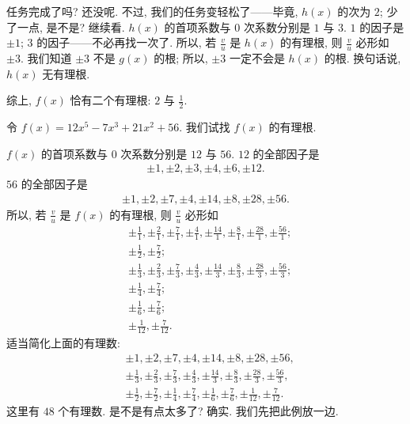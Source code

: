 \begin{example}
    任务完成了吗? 还没呢. 不过, 我们的任务变轻松了——毕竟, $h(x)$ 的次为 $2$; 少了一点, 是不是? 继续看. $h(x)$ 的首项系数与 $0$ 次系数分别是 $1$ 与 $3$. $1$ 的因子是 $\pm 1$; $3$ 的因子——不必再找一次了. 所以, 若 $\frac{v}{u}$ 是 $h(x)$ 的有理根, 则 $\frac{v}{u}$ 必形如 $\pm 3$. 我们知道 $\pm 3$ 不是 $g(x)$ 的根; 所以, $\pm 3$ 一定不会是 $h(x)$ 的根. 换句话说, $h(x)$ 无有理根.

    综上, $f(x)$ 恰有二个有理根: $2$ 与 $\frac{1}{2}$.
\end{example}

\begin{example}
    令 $f(x) = 12 x^5-7 x^3+21 x^2+56$. 我们试找 $f(x)$ 的有理根.

    $f(x)$ 的首项系数与 $0$ 次系数分别是 $12$ 与 $56$. $12$ 的全部因子是
    \begin{align*}
        \pm 1, \pm 2, \pm 3, \pm 4, \pm 6, \pm 12.
    \end{align*}
    $56$ 的全部因子是
    \begin{align*}
        \pm 1, \pm 2, \pm 7, \pm 4, \pm 14, \pm 8, \pm 28, \pm 56.
    \end{align*}
    所以, 若 $\frac{v}{u}$ 是 $f(x)$ 的有理根, 则 $\frac{v}{u}$ 必形如
    \begin{align*}
         & {\pm \frac{1}{1}}, {\pm \frac{2}{1}}, {\pm \frac{7}{1}}, {\pm \frac{4}{1}}, {\pm \frac{14}{1}}, {\pm \frac{8}{1}}, {\pm \frac{28}{1}}, {\pm \frac{56}{1}}; \\
         & {\pm \frac{1}{2}}, {\pm \frac{7}{2}};                                                                                                                      \\
         & {\pm \frac{1}{3}}, {\pm \frac{2}{3}}, {\pm \frac{7}{3}}, {\pm \frac{4}{3}}, {\pm \frac{14}{3}}, {\pm \frac{8}{3}}, {\pm \frac{28}{3}}, {\pm \frac{56}{3}}; \\
         & {\pm \frac{1}{4}}, {\pm \frac{7}{4}};                                                                                                                      \\
         & {\pm \frac{1}{6}}, {\pm \frac{7}{6}};                                                                                                                      \\
         & {\pm \frac{1}{12}}, {\pm \frac{7}{12}}.
    \end{align*}
    适当简化上面的有理数:
    \begin{align*}
         & {\pm 1}, {\pm 2}, {\pm 7}, {\pm 4}, {\pm 14}, {\pm 8}, {\pm 28}, {\pm 56},                                                                                 \\
         & {\pm \frac{1}{3}}, {\pm \frac{2}{3}}, {\pm \frac{7}{3}}, {\pm \frac{4}{3}}, {\pm \frac{14}{3}}, {\pm \frac{8}{3}}, {\pm \frac{28}{3}}, {\pm \frac{56}{3}}, \\
         & {\pm \frac{1}{2}}, {\pm \frac{7}{2}}, {\pm \frac{1}{4}}, {\pm \frac{7}{4}}, {\pm \frac{1}{6}}, {\pm \frac{7}{6}}, {\pm \frac{1}{12}}, {\pm \frac{7}{12}}.
    \end{align*}
    这里有 $48$ 个有理数. 是不是有点太多了? 确实. 我们先把此例放一边.
\end{example}

